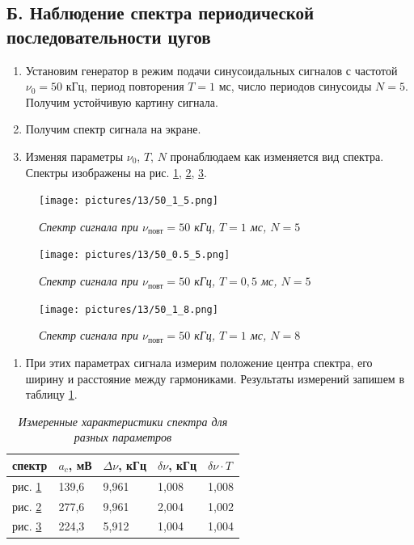 \documentclass[a4paper,12pt]{article}
\begin{document}
\FloatBarrier

\subsection*{Б. Наблюдение спектра периодической последовательности цугов}

\begin{enumerate}[resume]
    \item Установим генератор в режим подачи синусоидальных сигналов с частотой $\nu_0 = 50$ кГц, период повторения $T = 1$ мс, число периодов синусоиды $N = 5$. Получим устойчивую картину сигнала.
    \item Получим спектр сигнала на экране.
    \item Изменяя параметры $\nu_0$, $T$, $N$ пронаблюдаем как изменяется вид спектра. Спектры изображены на рис. \ref{pic:zug-1}, \ref{pic:zug-2}, \ref{pic:zug-3}.
\end{enumerate}


\FloatBarrier

\begin{figure}[!ht]
        \centering
	\texttt{[image: pictures/13/50\_1\_5.png]}
	\caption{\textit{Спектр сигнала при $\nu_\text{повт} = 50$ кГц, $T = 1$ мс, $N = 5$}}
	\label{pic:zug-1}
\end{figure}

\begin{figure}[!ht]
        \centering
	\texttt{[image: pictures/13/50\_0.5\_5.png]}
	\caption{\textit{Спектр сигнала при $\nu_\text{повт} = 50$ кГц, $T = 0,5$ мс, $N = 5$}}
	\label{pic:zug-2}
\end{figure}

\begin{figure}[!ht]
        \centering
	\texttt{[image: pictures/13/50\_1\_8.png]}
	\caption{\textit{Спектр сигнала при $\nu_\text{повт} = 50$ кГц, $T = 1$ мс, $N = 8$}}
	\label{pic:zug-3}
\end{figure}

\FloatBarrier

\begin{enumerate}[resume]
    \item При этих параметрах сигнала измерим положение центра спектра, его ширину и расстояние между гармониками. Результаты измерений запишем в таблицу \ref{table:4}.
\end{enumerate}

\FloatBarrier
\begin{table}[]
    \centering
    \caption{\textit{Измеренные характеристики спектра для разных параметров}}
    \begin{tabular}{|l|l|l|l|l|}
        \hline
        спектр & $a_c$, мВ & $\Delta \nu$, кГц & $\delta \nu$, кГц & $\delta \nu \cdot T$ \\ \hline
        рис. \ref{pic:zug-1} & 139,6 & 9,961 & 1,008 & 1,008 \\ \hline
        рис. \ref{pic:zug-2} & 277,6 & 9,961 & 2,004 & 1,002 \\ \hline
        рис. \ref{pic:zug-3} & 224,3 & 5,912 & 1,004 & 1,004 \\ \hline
    \end{tabular}
    \label{table:4}
\end{table}
\FloatBarrier
\end{document}
